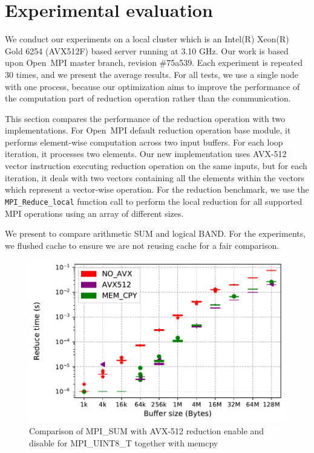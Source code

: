 \documentclass[5p,times,twocolumn]{elsarticle}
\newcommand{\mpifunc}[1]{\lstinline"MPI_#1"\xspace}
\newcommand{\ompi}[0]{Open~MPI\xspace}
\begin{document}
\section{Experimental evaluation}\label{sec:experiments}
We conduct our experiments on a local cluster which is an Intel(R)
Xeon(R) Gold 6254 (AVX512F) based server running at 3.10 GHz. Our work is based
upon \ompi master branch, revision \#75a539. Each experiment is
repeated 30 times, and we present the average results.
For all tests, we use a single node with one
process, because our optimization aims to improve the performance of
the computation part of reduction operation rather than the
communication.

This section compares the performance of the reduction operation with two
implementations.
For \ompi default reduction operation base module, it
performs element-wise computation across two input buffers. For each loop iteration,
it processes two elements. Our new implementation uses AVX-512 vector instruction
executing reduction operation on the same inputs, but for each iteration, it
deals with two vectors containing all the elements within the vectors which represent
a vector-wise operation.
For the reduction benchmark, we use the \mpifunc{Reduce_local} function call to
perform the local reduction for all supported MPI operations using an array of different sizes.

We present to compare arithmetic SUM and logical BAND.
For the experiments, we flushed cache to ensure we are not reusing cache for a fair comparison.

\begin{figure}[h]
    \centering
    \includegraphics[width=\linewidth]{avx_extend_more_sum_u8_1k-128M.pdf}
    \caption{Comparison of MPI\_SUM with AVX-512 reduction enable and disable for MPI\_UINT8\_T together with memcpy}
    \label{fig:avxsum}
\end{figure}
\end{document}
